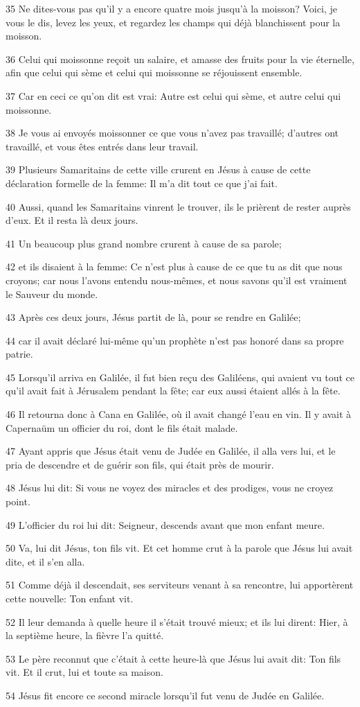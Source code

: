 \par 35 Ne dites-vous pas qu'il y a encore quatre mois jusqu'à la moisson? Voici, je vous le dis, levez les yeux, et regardez les champs qui déjà blanchissent pour la moisson.
\par 36 Celui qui moissonne reçoit un salaire, et amasse des fruits pour la vie éternelle, afin que celui qui sème et celui qui moissonne se réjouissent ensemble.
\par 37 Car en ceci ce qu'on dit est vrai: Autre est celui qui sème, et autre celui qui moissonne.
\par 38 Je vous ai envoyés moissonner ce que vous n'avez pas travaillé; d'autres ont travaillé, et vous êtes entrés dans leur travail.
\par 39 Plusieurs Samaritains de cette ville crurent en Jésus à cause de cette déclaration formelle de la femme: Il m'a dit tout ce que j'ai fait.
\par 40 Aussi, quand les Samaritains vinrent le trouver, ils le prièrent de rester auprès d'eux. Et il resta là deux jours.
\par 41 Un beaucoup plus grand nombre crurent à cause de sa parole;
\par 42 et ils disaient à la femme: Ce n'est plus à cause de ce que tu as dit que nous croyons; car nous l'avons entendu nous-mêmes, et nous savons qu'il est vraiment le Sauveur du monde.
\par 43 Après ces deux jours, Jésus partit de là, pour se rendre en Galilée;
\par 44 car il avait déclaré lui-même qu'un prophète n'est pas honoré dans sa propre patrie.
\par 45 Lorsqu'il arriva en Galilée, il fut bien reçu des Galiléens, qui avaient vu tout ce qu'il avait fait à Jérusalem pendant la fête; car eux aussi étaient allés à la fête.
\par 46 Il retourna donc à Cana en Galilée, où il avait changé l'eau en vin. Il y avait à Capernaüm un officier du roi, dont le fils était malade.
\par 47 Ayant appris que Jésus était venu de Judée en Galilée, il alla vers lui, et le pria de descendre et de guérir son fils, qui était près de mourir.
\par 48 Jésus lui dit: Si vous ne voyez des miracles et des prodiges, vous ne croyez point.
\par 49 L'officier du roi lui dit: Seigneur, descends avant que mon enfant meure.
\par 50 Va, lui dit Jésus, ton fils vit. Et cet homme crut à la parole que Jésus lui avait dite, et il s'en alla.
\par 51 Comme déjà il descendait, ses serviteurs venant à sa rencontre, lui apportèrent cette nouvelle: Ton enfant vit.
\par 52 Il leur demanda à quelle heure il s'était trouvé mieux; et ils lui dirent: Hier, à la septième heure, la fièvre l'a quitté.
\par 53 Le père reconnut que c'était à cette heure-là que Jésus lui avait dit: Ton fils vit. Et il crut, lui et toute sa maison.
\par 54 Jésus fit encore ce second miracle lorsqu'il fut venu de Judée en Galilée.

